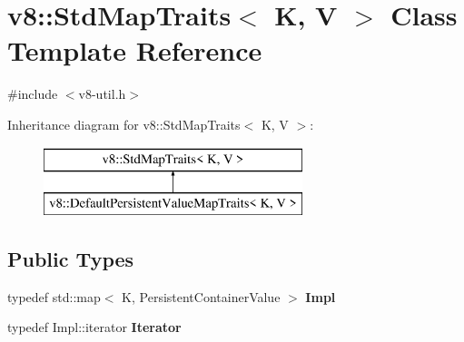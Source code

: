 \hypertarget{classv8_1_1_std_map_traits}{}\section{v8\+:\+:Std\+Map\+Traits$<$ K, V $>$ Class Template Reference}
\label{classv8_1_1_std_map_traits}


{\ttfamily \#include $<$v8-\/util.\+h$>$}

Inheritance diagram for v8\+:\+:Std\+Map\+Traits$<$ K, V $>$\+:\begin{figure}[H]
\begin{center}
\leavevmode
\includegraphics[height=2.000000cm]{classv8_1_1_std_map_traits}
\end{center}
\end{figure}
\subsection*{Public Types}
\begin{DoxyCompactItemize}
\item 
\hypertarget{classv8_1_1_std_map_traits_ac64cb78b3ef5cfbc35cf03837552e4ea}{}typedef std\+::map$<$ K, Persistent\+Container\+Value $>$ {\bfseries Impl}\label{classv8_1_1_std_map_traits_ac64cb78b3ef5cfbc35cf03837552e4ea}

\item 
\hypertarget{classv8_1_1_std_map_traits_ad20ef2022e83bfba6dcee23a2a34098e}{}typedef Impl\+::iterator {\bfseries Iterator}\label{classv8_1_1_std_map_traits_ad20ef2022e83bfba6dcee23a2a34098e}

\end{DoxyCompactItemize}
